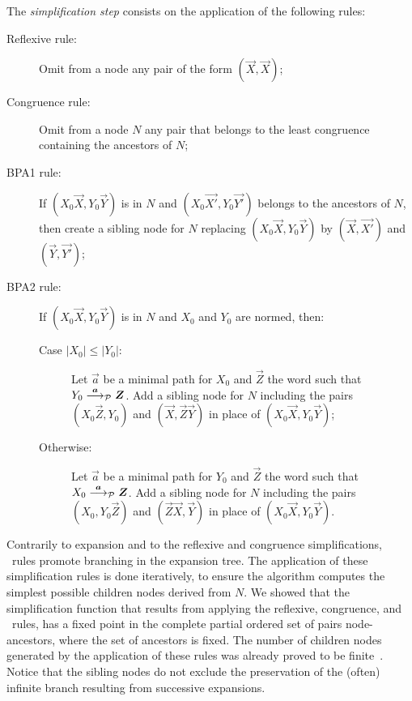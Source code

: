 The \emph{simplification step} consists on the application of the
following rules:
%
\begin{description}
\item[Reflexive rule:] Omit from a node any pair of the form
  $(\vec X,\vec X)$;
\item[Congruence rule:] Omit from a node $N$ any pair that belongs to
  the least congruence containing the ancestors of $N$;
\item[BPA1 rule:] If $(X_0 \vec X, Y_0 \vec Y)$ is in
  $N$ and $(X_0 \vec {X'}, Y_0 \vec {Y'})$ belongs to the ancestors of
  $N$, then create a sibling node for $N$ replacing
  $(X_0 \vec X, Y_0 \vec Y)$ by $(\vec X, \vec {X'})$ and
  $(\vec Y, \vec {Y'})$;
\item[BPA2 rule:] If $(X_0 \vec X, Y_0 \vec Y)$ is in $N$
  and $X_0$ and $Y_0$ are normed, then:
  \begin{description}
  \item[Case $|X_0| \leq |Y_0|$:] Let $\vec a$ be a minimal path
    for $X_0$ and $\vec Z$ the word such that
    $ Y_0 \LTSderivesP[\vec a] \vec Z$. Add a sibling node for
    $N$ including the pairs $(X_0 \vec Z, Y_0)$ and
    $(\vec X, \vec Z \vec Y)$ in place of $(X_0 \vec X, Y_0 \vec Y)$;
  \item[Otherwise:] Let $\vec a$ be a minimal path for 
    $Y_0$ and $\vec Z$ the word such that
    $ X_0 \LTSderivesP[\vec a] \vec Z$. Add a sibling node for $N$
    including the pairs $(X_0 , Y_0 \vec Z )$ and
    $(\vec Z\vec X, \vec Y)$ in place of $(X_0 \vec X, Y_0 \vec Y)$.
  \end{description}
\end{description}

Contrarily to expansion and to the reflexive and congruence
simplifications, \BPA\ rules promote branching in the expansion
tree. 
The application of these simplification rules is done iteratively,
to ensure the algorithm computes 
the simplest possible children nodes
derived from $N$. We showed that the simplification function that
results from applying the reflexive, congruence, and \BPA\ 
rules, has a fixed point in the complete partial ordered set of
pairs node-ancestors, where the set of ancestors is fixed.
The number of children nodes generated by the application 
of these rules was already proved to be
finite~\cite{DBLP:journals/iandc/ChristensenHS95,janvcar1999techniques}.
%
Notice that the sibling nodes do not exclude the
preservation of the (often) infinite
branch resulting from successive expansions.

